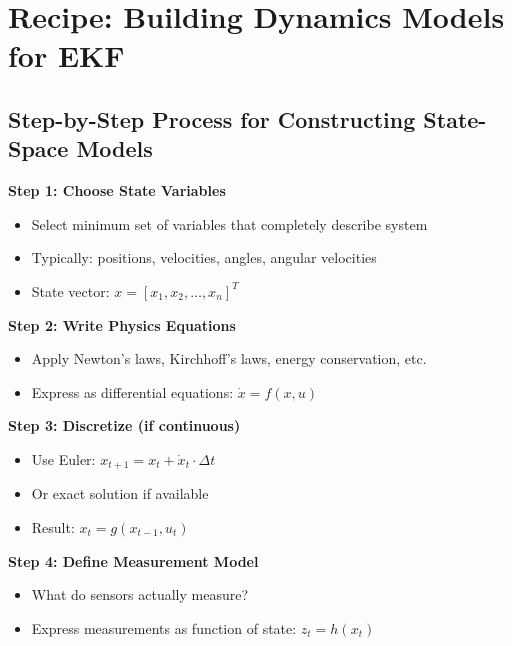 \section{Recipe: Building Dynamics Models for EKF}

\subsection{Step-by-Step Process for Constructing State-Space Models}

\begin{tcolorbox}[colback=green!5!white,colframe=green!60!black,title=Dynamics Modeling Recipe]

\textbf{Step 1: Choose State Variables}
\begin{itemize}
    \item Select minimum set of variables that completely describe system
    \item Typically: positions, velocities, angles, angular velocities
    \item State vector: $x = [x_1, x_2, \ldots, x_n]^T$
\end{itemize}

\textbf{Step 2: Write Physics Equations}
\begin{itemize}
    \item Apply Newton's laws, Kirchhoff's laws, energy conservation, etc.
    \item Express as differential equations: $\dot{x} = f(x, u)$
\end{itemize}

\textbf{Step 3: Discretize (if continuous)}
\begin{itemize}
    \item Use Euler: $x_{t+1} = x_t + \dot{x}_t \cdot \Delta t$
    \item Or exact solution if available
    \item Result: $x_t = g(x_{t-1}, u_t)$
\end{itemize}

\textbf{Step 4: Define Measurement Model}
\begin{itemize}
    \item What do sensors actually measure?
    \item Express measurements as function of state: $z_t = h(x_t)$
\end{itemize}


\end{tcolorbox}
